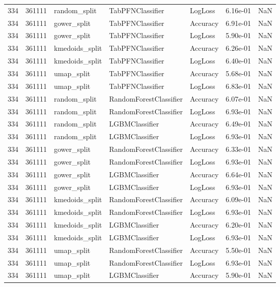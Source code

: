 \begin{tabular}{rrlllrr}
334 & 361111 & random\_split & TabPFNClassifier & LogLoss & 6.16e-01 & NaN \\
334 & 361111 & gower\_split & TabPFNClassifier & Accuracy & 6.91e-01 & NaN \\
334 & 361111 & gower\_split & TabPFNClassifier & LogLoss & 5.90e-01 & NaN \\
334 & 361111 & kmedoids\_split & TabPFNClassifier & Accuracy & 6.26e-01 & NaN \\
334 & 361111 & kmedoids\_split & TabPFNClassifier & LogLoss & 6.40e-01 & NaN \\
334 & 361111 & umap\_split & TabPFNClassifier & Accuracy & 5.68e-01 & NaN \\
334 & 361111 & umap\_split & TabPFNClassifier & LogLoss & 6.83e-01 & NaN \\
334 & 361111 & random\_split & RandomForestClassifier & Accuracy & 6.07e-01 & NaN \\
334 & 361111 & random\_split & RandomForestClassifier & LogLoss & 6.93e-01 & NaN \\
334 & 361111 & random\_split & LGBMClassifier & Accuracy & 6.49e-01 & NaN \\
334 & 361111 & random\_split & LGBMClassifier & LogLoss & 6.93e-01 & NaN \\
334 & 361111 & gower\_split & RandomForestClassifier & Accuracy & 6.33e-01 & NaN \\
334 & 361111 & gower\_split & RandomForestClassifier & LogLoss & 6.93e-01 & NaN \\
334 & 361111 & gower\_split & LGBMClassifier & Accuracy & 6.64e-01 & NaN \\
334 & 361111 & gower\_split & LGBMClassifier & LogLoss & 6.93e-01 & NaN \\
334 & 361111 & kmedoids\_split & RandomForestClassifier & Accuracy & 6.09e-01 & NaN \\
334 & 361111 & kmedoids\_split & RandomForestClassifier & LogLoss & 6.93e-01 & NaN \\
334 & 361111 & kmedoids\_split & LGBMClassifier & Accuracy & 6.20e-01 & NaN \\
334 & 361111 & kmedoids\_split & LGBMClassifier & LogLoss & 6.93e-01 & NaN \\
334 & 361111 & umap\_split & RandomForestClassifier & Accuracy & 5.50e-01 & NaN \\
334 & 361111 & umap\_split & RandomForestClassifier & LogLoss & 6.93e-01 & NaN \\
334 & 361111 & umap\_split & LGBMClassifier & Accuracy & 5.90e-01 & NaN \\

\end{tabular}
